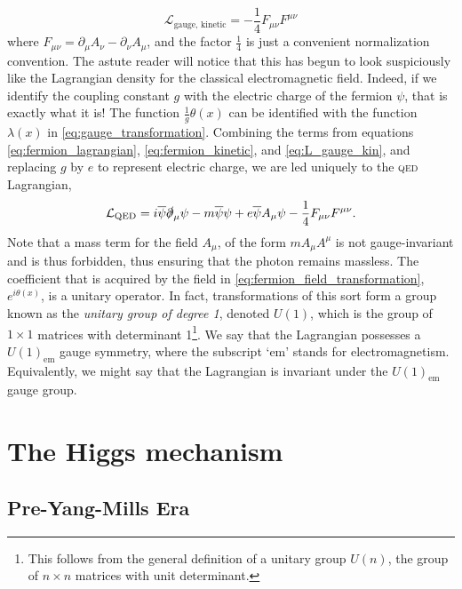 %
\begin{equation}\label{eq:L_gauge_kin}
\mathcal{L}_\text{gauge, kinetic} = -\frac{1}{4}F_{\mu\nu}F^{\mu\nu}
\end{equation}
%
where $F_{\mu\nu} = \partial_\mu A_\nu - \partial_\nu A_\mu$, and the factor $\frac{1}{4}$ is just a convenient normalization convention. The astute reader will notice that this has begun to look suspiciously like the Lagrangian density for the classical electromagnetic field. Indeed, if we identify the coupling constant $g$ with the electric charge of the fermion $\psi$, that is exactly what it is! The function $\frac{1}{g} \theta(x)$ can be identified with the function $\lambda(x)$ in \eqref{eq:gauge_transformation}. Combining the terms from equations \ref{eq:fermion_lagrangian}, \ref{eq:fermion_kinetic}, and \ref{eq:L_gauge_kin}, and replacing $g$ by $e$ to represent electric charge, we are led uniquely to the \textsc{qed} Lagrangian,
\begin{equation}
  \mathcal{L}_\text{QED} = i\overline{\psi}\slashed{\partial}_\mu\psi - m\overline{\psi}\psi + e\overline{\psi}A_\mu\psi -\frac{1}{4}F_{\mu\nu}F^{\mu\nu}.
\end{equation}
Note that a mass term for the field $A_\mu$, of the form $mA_\mu A^\mu$ is not gauge-invariant and is thus forbidden, thus ensuring that the photon remains massless.
The coefficient that is acquired by the field in \eqref{eq:fermion_field_transformation}, $e^{i\theta(x)}$, is a unitary operator. In fact, transformations of this sort form a group known as the \emph{unitary group of degree 1}, denoted $U(1)$, which is the group of $1\times 1$ matrices with determinant 1\footnote{This follows from the general definition of a unitary group $U(n)$, the group of $n\times n$ matrices with unit determinant.}. We say that the Lagrangian possesses a $U(1)_\text{em}$ gauge symmetry, where the subscript `em' stands for electromagnetism. Equivalently, we might say that the Lagrangian is invariant under the $U(1)_\text{em}$ gauge group. 

\section{The Higgs mechanism}
\subsection{Pre-Yang-Mills Era}\label{subsec:pre_yang_mills}

